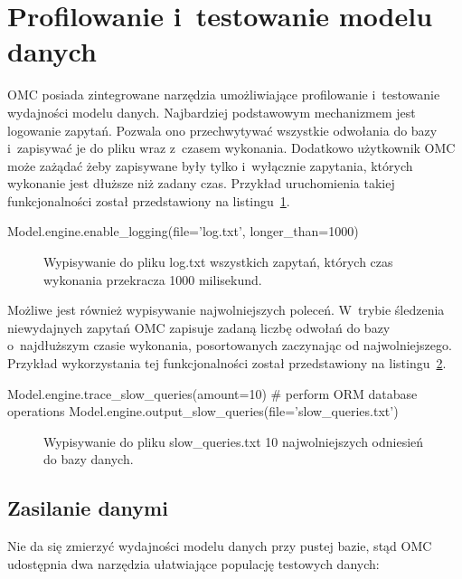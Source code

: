 \section{Profilowanie i~testowanie modelu danych}
\label{sec:ocm_profiling}

OMC posiada zintegrowane narzędzia umożliwiające profilowanie i~testowanie wydajności modelu danych. Najbardziej podstawowym mechanizmem jest logowanie zapytań. Pozwala ono przechwytywać wszystkie odwołania do bazy i~zapisywać je do pliku wraz z~czasem wykonania. Dodatkowo użytkownik OMC może zażądać żeby zapisywane były tylko i~wyłącznie zapytania, których wykonanie jest dłuższe niż zadany czas. Przykład uruchomienia takiej funkcjonalności został przedstawiony na listingu~\ref{vrb:engine_logging}.

\begin{verbbox}[\footnotesize]
	Model.engine.enable_logging(file='log.txt', longer_than=1000)
\end{verbbox}

\begin{figure}[ht!]
	\centering
	\theverbbox
	\caption{Wypisywanie do pliku log.txt wszystkich zapytań, których czas wykonania przekracza 1000 milisekund.}
	\label{vrb:engine_logging}
\end{figure}

Możliwe jest również wypisywanie najwolniejszych poleceń. W~trybie śledzenia niewydajnych zapytań OMC zapisuje zadaną liczbę odwołań do bazy o~najdłuższym czasie wykonania, posortowanych zaczynając od najwolniejszego. Przykład wykorzystania tej funkcjonalności został przedstawiony na listingu~\ref{vrb:engine_slow_queries}.

\begin{verbbox}[\footnotesize]
	Model.engine.trace_slow_queries(amount=10)
	# perform ORM database operations
	Model.engine.output_slow_queries(file='slow_queries.txt')
\end{verbbox}

\begin{figure}[ht!]
	\centering
	\theverbbox
	\caption{Wypisywanie do pliku slow\_queries.txt 10 najwolniejszych odniesień do bazy danych.}
	\label{vrb:engine_slow_queries}
\end{figure}

\subsection{Zasilanie danymi}

Nie da się zmierzyć wydajności modelu danych przy pustej bazie, stąd OMC udostępnia dwa narzędzia ułatwiające populację testowych danych:

